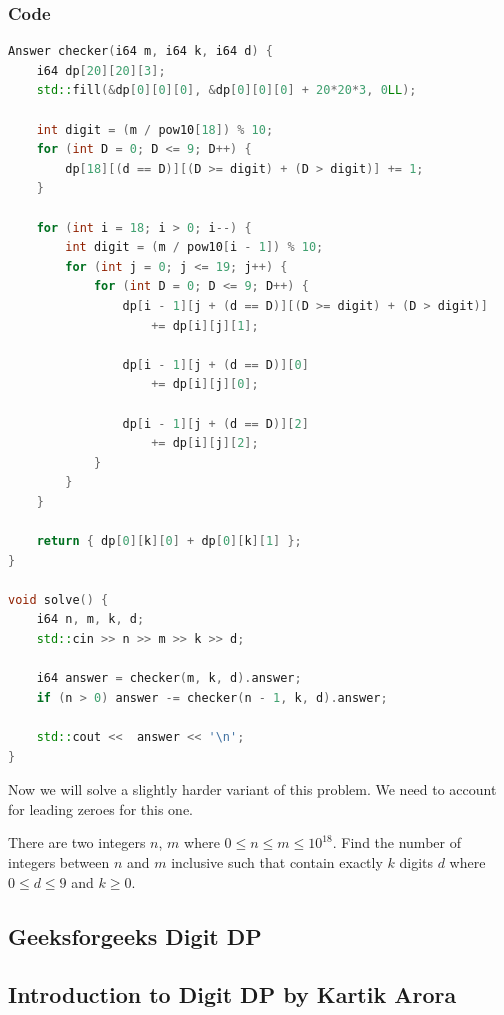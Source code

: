 \documentclass[11pt]{scrartcl}
\begin{document}
\subsubsection*{Code}
\begin{lstlisting}[language=C++]
Answer checker(i64 m, i64 k, i64 d) {
    i64 dp[20][20][3];
    std::fill(&dp[0][0][0], &dp[0][0][0] + 20*20*3, 0LL);

    int digit = (m / pow10[18]) % 10;
    for (int D = 0; D <= 9; D++) {
        dp[18][(d == D)][(D >= digit) + (D > digit)] += 1;
    }

    for (int i = 18; i > 0; i--) {
        int digit = (m / pow10[i - 1]) % 10;
        for (int j = 0; j <= 19; j++) {
            for (int D = 0; D <= 9; D++) {
                dp[i - 1][j + (d == D)][(D >= digit) + (D > digit)]
                    += dp[i][j][1];
                
                dp[i - 1][j + (d == D)][0]
                    += dp[i][j][0];

                dp[i - 1][j + (d == D)][2]
                    += dp[i][j][2];
            }
        }
    }

    return { dp[0][k][0] + dp[0][k][1] };
}

void solve() {
    i64 n, m, k, d;
    std::cin >> n >> m >> k >> d;

    i64 answer = checker(m, k, d).answer;
    if (n > 0) answer -= checker(n - 1, k, d).answer;

    std::cout <<  answer << '\n';
}    
\end{lstlisting}

Now we will solve a slightly harder variant of this problem. We need to account for leading zeroes for this one.
\begin{problem}
    There are two integers $n$, $m$ where $0 \le n \le m \le 10^{18}$. Find the number of integers between $n$ and $m$ inclusive such that contain exactly $k$ digits $d$ where $0 \le d \le 9$ and $k \geq 0$.
\end{problem}



\newpage
\subsection{Geeksforgeeks Digit DP}

\subsection{Introduction to Digit DP by Kartik Arora}
\end{document}
